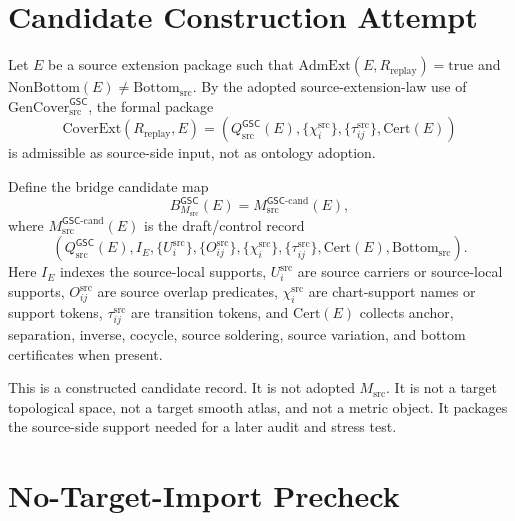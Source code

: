 \documentclass[11pt]{article}
\newcommand{\GSC}{\mathsf{GSC}}
\newcommand{\Msrc}{M_{\mathrm{src}}}
\newcommand{\Qsrc}{Q_{\mathrm{src}}}
\newcommand{\Bottomsrc}{\mathrm{Bottom}_{\mathrm{src}}}
\newcommand{\GenCover}{\mathrm{GenCover}_{\mathrm{src}}^{\GSC}}
\begin{document}
\section{Candidate Construction Attempt}

Let \(E\) be a source extension package such that
\(\mathrm{AdmExt}(E,R_{\mathrm{replay}})=\mathrm{true}\) and
\(\mathrm{NonBottom}(E)\ne \Bottomsrc\). By the adopted source-extension-law
use of \(\GenCover\), the formal package
\[
  \mathrm{CoverExt}(R_{\mathrm{replay}},E)
  =
  \left(
  \Qsrc^{\GSC}(E),
  \{\chi_i^{\mathrm{src}}\},
  \{\tau_{ij}^{\mathrm{src}}\},
  \mathrm{Cert}(E)
  \right)
\]
is admissible as source-side input, not as ontology adoption.

Define the bridge candidate map
\[
  B_{\Msrc}^{\GSC}(E) = \Msrc^{\GSC\mbox{-}\mathrm{cand}}(E),
\]
where \(\Msrc^{\GSC\mbox{-}\mathrm{cand}}(E)\) is the draft/control record
\[
  \left(
  \Qsrc^{\GSC}(E),
  I_E,
  \{U_i^{\mathrm{src}}\},
  \{O_{ij}^{\mathrm{src}}\},
  \{\chi_i^{\mathrm{src}}\},
  \{\tau_{ij}^{\mathrm{src}}\},
  \mathrm{Cert}(E),
  \Bottomsrc
  \right).
\]
Here \(I_E\) indexes the source-local supports, \(U_i^{\mathrm{src}}\) are
source carriers or source-local supports, \(O_{ij}^{\mathrm{src}}\) are
source overlap predicates, \(\chi_i^{\mathrm{src}}\) are chart-support names
or support tokens, \(\tau_{ij}^{\mathrm{src}}\) are transition tokens, and
\(\mathrm{Cert}(E)\) collects anchor, separation, inverse, cocycle, source
soldering, source variation, and bottom certificates when present.

This is a constructed candidate record. It is not adopted \(\Msrc\). It is not
a target topological space, not a target smooth atlas, and not a metric object.
It packages the source-side support needed for a later audit and stress test.

\section{No-Target-Import Precheck}
\end{document}
